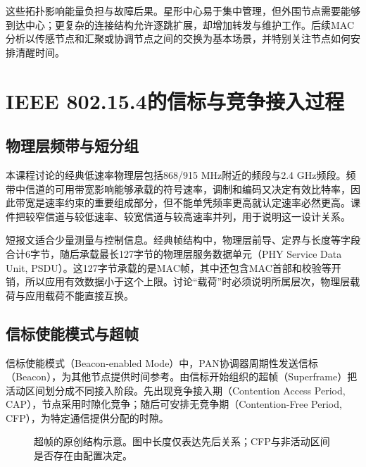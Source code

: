 这些拓扑影响能量负担与故障后果。星形中心易于集中管理，但外围节点需要能够到达中心；更复杂的连接结构允许逐跳扩展，却增加转发与维护工作。后续MAC分析以传感节点和汇聚或协调节点之间的交换为基本场景，并特别关注节点如何安排清醒时间。

\section{IEEE 802.15.4的信标与竞争接入过程}
\label{ch:154}

\subsection{物理层频带与短分组}

本课程讨论的经典低速率物理层包括868/915 MHz附近的频段与2.4 GHz频段。频带中信道的可用带宽影响能够承载的符号速率，调制和编码又决定有效比特率，因此带宽是速率约束的重要组成部分，但不能单凭频率更高就认定速率必然更高。课件把较窄信道与较低速率、较宽信道与较高速率并列，用于说明这一设计关系。

短报文适合少量测量与控制信息。经典帧结构中，物理层前导、定界与长度等字段合计6字节，随后承载最长127字节的物理层服务数据单元（PHY Service Data Unit, PSDU）。这127字节承载的是MAC帧，其中还包含MAC首部和校验等开销，所以应用有效数据小于这个上限。讨论“载荷”时必须说明所属层次，物理层载荷与应用载荷不能直接互换。

\subsection{信标使能模式与超帧}

信标使能模式（Beacon-enabled Mode）中，PAN协调器周期性发送信标（Beacon），为其他节点提供时间参考。由信标开始组织的超帧（Superframe）把活动区间划分成不同接入阶段。先出现竞争接入期（Contention Access Period, CAP），节点采用时隙化竞争；随后可安排无竞争期（Contention-Free Period, CFP），为特定通信提供分配的时隙。

\begin{figure}[htbp]
\centering
{}
\caption{超帧的原创结构示意。图中长度仅表达先后关系；CFP与非活动区间是否存在由配置决定。}
\label{fig:p4-superframe}
\end{figure}

